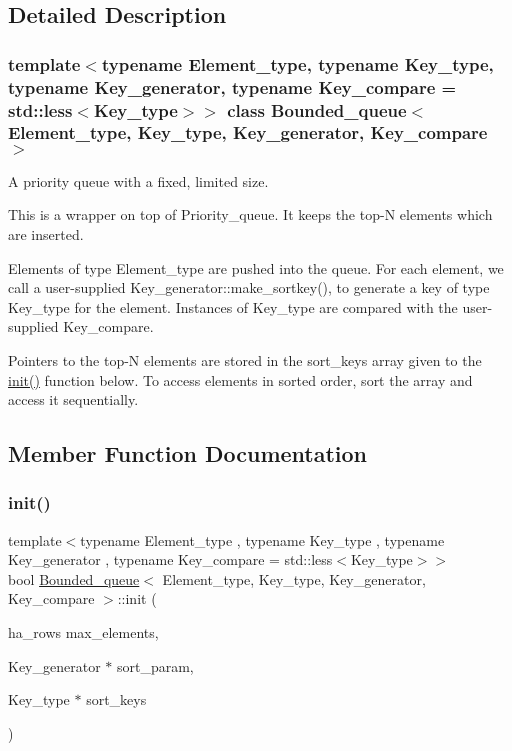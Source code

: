\subsection{Detailed Description}
\subsubsection*{template$<$typename Element\+\_\+type, typename Key\+\_\+type, typename Key\+\_\+generator, typename Key\+\_\+compare = std\+::less$<$\+Key\+\_\+type$>$$>$\newline
class Bounded\+\_\+queue$<$ Element\+\_\+type, Key\+\_\+type, Key\+\_\+generator, Key\+\_\+compare $>$}

A priority queue with a fixed, limited size.

This is a wrapper on top of Priority\+\_\+queue. It keeps the top-\/N elements which are inserted.

Elements of type Element\+\_\+type are pushed into the queue. For each element, we call a user-\/supplied Key\+\_\+generator\+::make\+\_\+sortkey(), to generate a key of type Key\+\_\+type for the element. Instances of Key\+\_\+type are compared with the user-\/supplied Key\+\_\+compare.

Pointers to the top-\/N elements are stored in the sort\+\_\+keys array given to the \mbox{\hyperlink{classBounded__queue_aff5e3f52cd3f4224fd3368883310a9b9}{init()}} function below. To access elements in sorted order, sort the array and access it sequentially. 

\subsection{Member Function Documentation}
\mbox{\label{classBounded__queue_aff5e3f52cd3f4224fd3368883310a9b9}} 
\subsubsection{\texorpdfstring{init()}{init()}}
{\footnotesize\ttfamily template$<$typename Element\+\_\+type , typename Key\+\_\+type , typename Key\+\_\+generator , typename Key\+\_\+compare  = std\+::less$<$\+Key\+\_\+type$>$$>$ \\
bool \mbox{\hyperlink{classBounded__queue}{Bounded\+\_\+queue}}$<$ Element\+\_\+type, Key\+\_\+type, Key\+\_\+generator, Key\+\_\+compare $>$\+::init (\begin{DoxyParamCaption}\item[{ha\+\_\+rows}]{max\+\_\+elements,  }\item[{Key\+\_\+generator $\ast$}]{sort\+\_\+param,  }\item[{Key\+\_\+type $\ast$}]{sort\+\_\+keys }\end{DoxyParamCaption})\hspace{0.3cm}{\ttfamily [inline]}}

